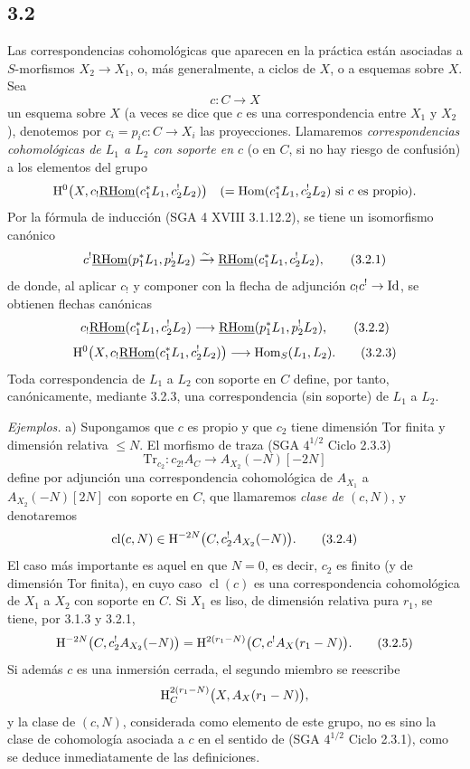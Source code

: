 \subsection*{3.2}
Las correspondencias cohomológicas que aparecen en la práctica están asociadas a $S$-morfismos $X_2\to X_1$, o, más generalmente, a ciclos de $X$, o a esquemas sobre $X$. Sea
\[
c:C\longrightarrow X
\]
un esquema sobre $X$ (a veces se dice que $c$ es una correspondencia entre $X_1$ y $X_2$), denotemos por $c_i=p_ic:C\to X_i$ las proyecciones. Llamaremos \emph{correspondencias cohomológicas de $L_1$ a $L_2$ con soporte en $c$} (o en $C$, si no hay riesgo de confusión) a los elementos del grupo
\[
\mathrm{H}^0\bigl(X,c_!\underline{\mathrm{RHom}}(c_1^*L_1,c_2^!L_2)\bigr)
\quad(=\operatorname{Hom}(c_1^*L_1,c_2^!L_2)\text{ si }c\text{ es propio}).
\]
Por la fórmula de inducción (SGA 4 XVIII 3.1.12.2), se tiene un isomorfismo canónico
\begin{equation}
c^!\underline{\mathrm{RHom}}(p_1^*L_1,p_2^!L_2)
\xrightarrow{\sim}
\underline{\mathrm{RHom}}(c_1^*L_1,c_2^!L_2),
\tag{3.2.1}
\end{equation}
de donde, al aplicar $c_!$ y componer con la flecha de adjunción $c_!c^!\to \mathrm{Id}$, se obtienen flechas canónicas
\begin{equation}
c_!\underline{\mathrm{RHom}}(c_1^*L_1,c_2^!L_2)
\longrightarrow
\underline{\mathrm{RHom}}(p_1^*L_1,p_2^!L_2),
\tag{3.2.2}
\end{equation}
\begin{equation}
\mathrm{H}^0\bigl(X,c_!\underline{\mathrm{RHom}}(c_1^*L_1,c_2^!L_2)\bigr)
\longrightarrow
\operatorname{Hom}_S(L_1,L_2).
\tag{3.2.3}
\end{equation}
Toda correspondencia de $L_1$ a $L_2$ con soporte en $C$ define, por tanto, canónicamente, mediante 3.2.3, una correspondencia (sin soporte) de $L_1$ a $L_2$.

\emph{Ejemplos.} a) Supongamos que $c$ es propio y que $c_2$ tiene dimensión Tor finita y dimensión relativa $\leq N$. El morfismo de traza (SGA $4^{1/2}$ Ciclo 2.3.3)
\[
\mathrm{Tr}_{c_2}:c_{2!}A_C\longrightarrow A_{X_2}(-N)[-2N]
\]
define por adjunción una correspondencia cohomológica de $A_{X_1}$ a $A_{X_2}(-N)[2N]$ con soporte en $C$, que llamaremos \emph{clase de $(c,N)$}, y denotaremos
\begin{equation}
\operatorname{cl}(c,N)\in \mathrm{H}^{-2N}\bigl(C,c_2^!A_{X_2}(-N)\bigr).
\tag{3.2.4}
\end{equation}
El caso más importante es aquel en que $N=0$, es decir, $c_2$ es finito (y de dimensión Tor finita), en cuyo caso $\operatorname{cl}(c)$ es una correspondencia cohomológica de $X_1$ a $X_2$ con soporte en $C$. Si $X_1$ es liso, de dimensión relativa pura $r_1$, se tiene, por 3.1.3 y 3.2.1,
\begin{equation}
\mathrm{H}^{-2N}\bigl(C,c_2^!A_{X_2}(-N)\bigr)
=
\mathrm{H}^{2(r_1-N)}\bigl(C,c^!A_X(r_1-N)\bigr).
\tag{3.2.5}
\end{equation}
Si además $c$ es una inmersión cerrada, el segundo miembro se reescribe
\[
\mathrm{H}^{2(r_1-N)}_C\bigl(X,A_X(r_1-N)\bigr),
\]
y la clase de $(c,N)$, considerada como elemento de este grupo, no es sino la clase de cohomología asociada a $c$ en el sentido de (SGA $4^{1/2}$ Ciclo 2.3.1), como se deduce inmediatamente de las definiciones.

